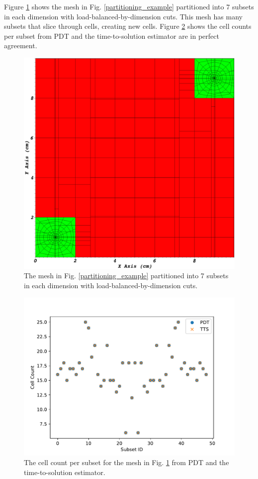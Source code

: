 Figure \ref{ubp_7x7} shows the mesh in Fig. \ref{partitioning_example} partitioned into 7 subsets in each dimension with load-balanced-by-dimension cuts. This mesh has many subsets that slice through cells, creating new cells. Figure \ref{cell_comp} shows the cell counts per subset from PDT and the time-to-solution estimator are in perfect agreement.
\begin{figure}[H]
\centering
\includegraphics[scale=0.15]{../figures/spiderweb_7x7_lbd.png}
\caption{The mesh in Fig. \ref{partitioning_example} partitioned into 7 subsets in each dimension with load-balanced-by-dimension cuts.}
\label{ubp_7x7}
\end{figure}
\begin{figure}[H]
\centering
\includegraphics[scale=0.75]{../figures/spiderweb_cell_comp_7x7.pdf}
\caption{The cell count per subset for the mesh in Fig. \ref{ubp_7x7} from PDT and the time-to-solution estimator.}
\label{cell_comp}
\end{figure}

